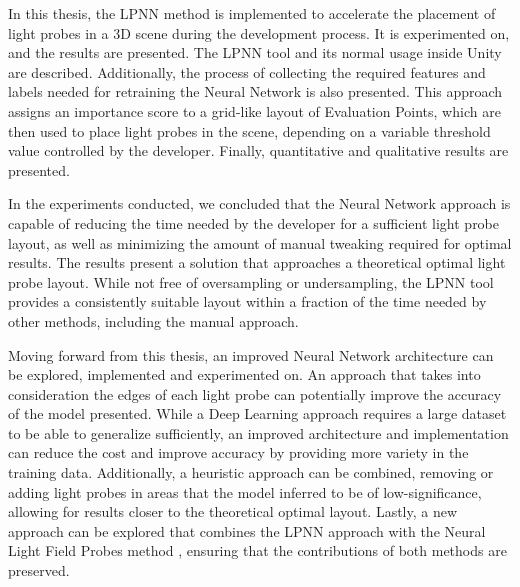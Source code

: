 In this thesis, the LPNN method is implemented to accelerate the placement of light probes in a 3D scene during the development process. It is experimented on, and the results are presented. The LPNN tool and its normal usage inside Unity are described. Additionally, the process of collecting the required features and labels needed for retraining the Neural Network is also presented. This approach assigns an importance score to a grid-like layout of Evaluation Points, which are then used to place light probes in the scene, depending on a variable threshold value controlled by the developer. Finally, quantitative and qualitative results are presented. 

In the experiments conducted, we concluded that the Neural Network approach is capable of reducing the time needed by the developer for a sufficient light probe layout, as well as minimizing the amount of manual tweaking required for optimal results. The results present a solution that approaches a theoretical optimal light probe layout. While not free of oversampling or undersampling, the LPNN tool provides a consistently suitable layout within a fraction of the time needed by other methods, including the manual approach.

Moving forward from this thesis, an improved Neural Network architecture can be explored, implemented and experimented on. An approach that takes into consideration the edges of each light probe can potentially improve the accuracy of the model presented. While a Deep Learning approach requires a large dataset to be able to generalize sufficiently, an improved architecture and implementation can reduce the cost and improve accuracy by providing more variety in the training data. Additionally, a heuristic approach can be combined, removing or adding light probes in areas that the model inferred to be of low-significance, allowing for results closer to the theoretical optimal layout. Lastly, a new approach can be explored that combines the LPNN approach with the Neural Light Field Probes method \parencite{You2024}, ensuring that the contributions of both methods are preserved.